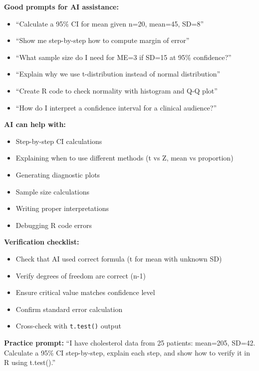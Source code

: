 \documentclass[11pt]{article}
\begin{document}
\begin{tcolorbox}[colback=aiblue!10,colframe=aiblue,title=Using AI Tools for Confidence Intervals]

\textbf{Good prompts for AI assistance:}
\begin{itemize}
\item ``Calculate a 95\% CI for mean given n=20, mean=45, SD=8''
\item ``Show me step-by-step how to compute margin of error''
\item ``What sample size do I need for ME=3 if SD=15 at 95\% confidence?''
\item ``Explain why we use t-distribution instead of normal distribution''
\item ``Create R code to check normality with histogram and Q-Q plot''
\item ``How do I interpret a confidence interval for a clinical audience?''
\end{itemize}

\textbf{AI can help with:}
\begin{itemize}
\item Step-by-step CI calculations
\item Explaining when to use different methods (t vs Z, mean vs proportion)
\item Generating diagnostic plots
\item Sample size calculations
\item Writing proper interpretations
\item Debugging R code errors
\end{itemize}

\textbf{Verification checklist:}
\begin{itemize}
\item Check that AI used correct formula (t for mean with unknown SD)
\item Verify degrees of freedom are correct (n-1)
\item Ensure critical value matches confidence level
\item Confirm standard error calculation
\item Cross-check with \texttt{t.test()} output
\end{itemize}

\textbf{Practice prompt:}
``I have cholesterol data from 25 patients: mean=205, SD=42. Calculate a 95\% CI step-by-step, explain each step, and show how to verify it in R using t.test().''
\end{tcolorbox}
\end{document}
